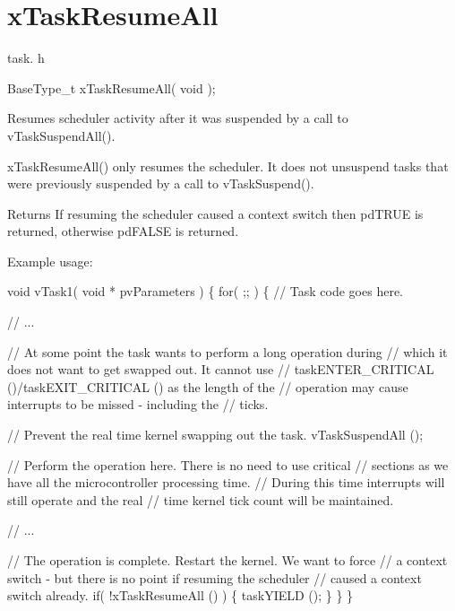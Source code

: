 \hypertarget{group__x_task_resume_all}{}\section{x\+Task\+Resume\+All}
\label{group__x_task_resume_all}
task. h 
\begin{DoxyPre}BaseType\_t xTaskResumeAll( void );\end{DoxyPre}


Resumes scheduler activity after it was suspended by a call to v\+Task\+Suspend\+All().

x\+Task\+Resume\+All() only resumes the scheduler. It does not unsuspend tasks that were previously suspended by a call to v\+Task\+Suspend().

\begin{DoxyReturn}{Returns}
If resuming the scheduler caused a context switch then pd\+T\+R\+U\+E is returned, otherwise pd\+F\+A\+L\+S\+E is returned.
\end{DoxyReturn}
Example usage\+: 
\begin{DoxyPre}
void vTask1( void * pvParameters )
\{
    for( ;; )
    \{
     // Task code goes here.\end{DoxyPre}



\begin{DoxyPre}     // ...\end{DoxyPre}



\begin{DoxyPre}     // At some point the task wants to perform a long operation during
     // which it does not want to get swapped out.  It cannot use
     // taskENTER\_CRITICAL ()/taskEXIT\_CRITICAL () as the length of the
     // operation may cause interrupts to be missed - including the
     // ticks.\end{DoxyPre}



\begin{DoxyPre}     // Prevent the real time kernel swapping out the task.
     vTaskSuspendAll ();\end{DoxyPre}



\begin{DoxyPre}     // Perform the operation here.  There is no need to use critical
     // sections as we have all the microcontroller processing time.
     // During this time interrupts will still operate and the real
     // time kernel tick count will be maintained.\end{DoxyPre}



\begin{DoxyPre}     // ...\end{DoxyPre}



\begin{DoxyPre}     // The operation is complete.  Restart the kernel.  We want to force
     // a context switch - but there is no point if resuming the scheduler
     // caused a context switch already.
     if( !xTaskResumeAll () )
     \{
          taskYIELD ();
     \}
    \}
\}
  \end{DoxyPre}
 